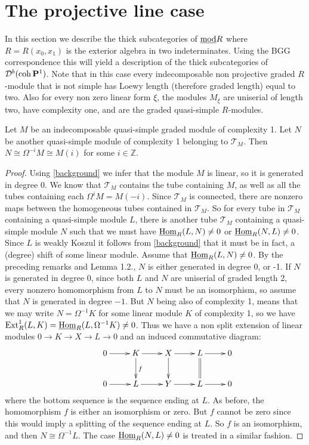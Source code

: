 \documentclass[10pt]{amsart}
\begin{document}
 



\section{The projective line case}

In this section we describe the thick subcategories of $\underline{\operatorname{mod}} R$ where $R=R(x_0,x_1)$ is the 
exterior algebra in two indeterminates. Using the BGG correspondence this will yield a description of the thick 
subcategories of $\mathcal D^b(\operatorname{coh} {\bf P}^1)$.  Note that in this case every 
indecomposable non projective graded $R$-module that is not simple has Loewy length 
(therefore graded length) equal to two. Also for every non zero linear form $\xi$, the modules $M_{\xi}$ are uniserial of length 
two, have complexity one, and are the graded quasi-simple $R$-modules.

\begin{prop} Let $M$ be an indecomposable quasi-simple graded module of complexity 1. 
Let $N$ be another quasi-simple module of complexity 1 belonging to $\mathcal T_M$. 
Then $N\cong\Omega^{-i}M\cong M(i)$ for some $i\in\mathbb Z$.

%
\begin{proof} Using \ref{background} we infer that the module $M$ is linear, 
so it is generated in degree 0. We know that $\mathcal T_M$ contains the tube containing $M$,
 as well as all the tubes containing each $\Omega^iM=M(-i)$. 
  Since $\mathcal T_M$ is 
connected, there are nonzero maps between the homogeneous tubes contained in $\mathcal T_M$. 
So for every tube in $\mathcal T_M$ containing a quasi-simple module $L$, there is another tube  
$\mathcal T_M$ containing a quasi-simple module $N$ such that we must have 
$\underline{\operatorname{Hom}}_R(L,N)\ne 0$ or $\underline{\operatorname{Hom}}_R(N,L)\ne 0$. Since $L$ is weakly Koszul it follows 
from \ref{background} that it must be in fact, a (degree) shift of some linear module.
Assume that $\underline{\operatorname{Hom}}_R(L,N)\ne 0$. By the preceding remarks and Lemma 1.2.,
$N$ is either generated in degree 0, or -1. If $N$ is generated in degree 0, since both $L$ and 
$N$ are uniserial of graded length 2, every nonzero homomorphism from $L$ to $N$ must be an isomorphism,
so assume that $N$ is generated in degree
  $-1$. But $N$ being also of complexity 1, means that we may write $N=\Omega^{-1}K$ for some linear 
module $K$ of complexity 1, so we have $\operatorname{Ext}\nolimits_R^1(L, K)=\underline{\operatorname{Hom}}_R(L,\Omega^{-1}K)\ne 0$.  
Thus we have a non split extension of linear modules 
$0\rightarrow K\rightarrow X\rightarrow L\rightarrow 0$ and an induced commutative diagram:
$$ 
\xymatrix
{ &0\ar[r]&K \ar^{f}[d]
\ar[r] &X\ar[d]\ar[r]
&L\ar@{=}[d] \ar[r] &0\\ &0 \ar[r] &L \ar[r]
&Y\ar[r] &L\ar[r]& 0} 
$$
where the bottom sequence is the \AR sequence ending at $L$. As before, the homomorphism $f$ is either 
an isomorphism or zero. But $f$ cannot be zero since this would imply a splitting of the \AR
sequence ending at $L$. So $f$ is an isomorphism, and then $N\cong\Omega^{-1}L$. The case 
$\underline{\operatorname{Hom}}_R(N,L)\ne 0$ is treated in a similar fashion. 
\end{proof}
\end{prop} 
\end{document}
